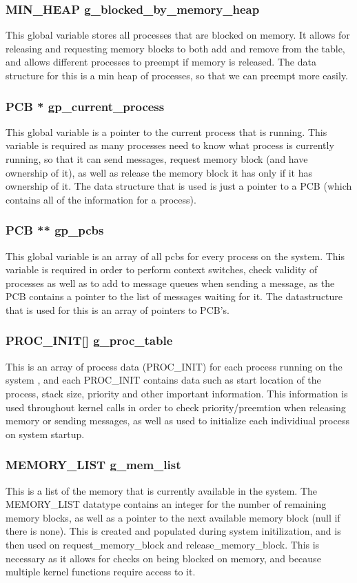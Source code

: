 \documentclass[12pt]{article}
\begin{document}
\subsubsection{MIN\_HEAP g\_blocked\_by\_memory\_heap}
  This global variable stores all processes that are blocked on memory. It allows for releasing and requesting memory blocks to both add and remove from the table, and allows different processes to preempt if memory is released. The data structure for this is a min heap of processes, so that we can preempt more easily.

\subsubsection{PCB * gp\_current\_process}
  This global variable is a pointer to the current process that is running. This variable is required as many processes need to know what process is currently running, so that it can send messages, request memory block (and have ownership of it), as well as release the memory block it has only if it has ownership of it. The data structure that is used is just a pointer to a PCB (which contains all of the information for a process).

\subsubsection{PCB ** gp\_pcbs}
  This global variable is an array of all pcbs for every process on the system. This variable is required in order to perform context switches, check validity of processes as well as to add to message queues when sending a message, as the PCB contains a pointer to the list of messages waiting for it. The datastructure that is used for this is an array of pointers to PCB's.

\subsubsection{PROC\_INIT[] g\_proc\_table}
  This is an array of process data (PROC\_INIT) for each process running on the system , and each PROC\_INIT contains data such as start location of the process, stack size, priority and other important information. This information is used throughout kernel calls in order to check priority/preemtion when releasing memory or sending messages, as well as used to initialize each individiual process on system startup.

\subsubsection{MEMORY\_LIST g\_mem\_list}
  This is a list of the memory that is currently available in the system. The MEMORY\_LIST datatype contains an integer for the number of remaining memory blocks, as well as a pointer to the next available memory block (null if there is none). This is created and populated during system initilization, and is then used on request\_memory\_block and release\_memory\_block. This is necessary as it allows for checks on being blocked on memory, and because multiple kernel functions require access to it.
\end{document}
